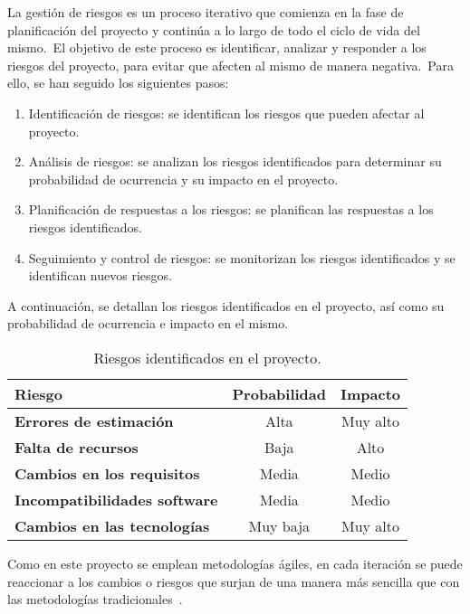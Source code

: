 
La gestión de riesgos es un proceso iterativo que comienza en la fase de planificación del proyecto y continúa a lo
largo de todo el ciclo de vida del mismo.\ El objetivo de este proceso es identificar, analizar y responder a los
riesgos del proyecto, para evitar que afecten al mismo de manera negativa.\ Para ello, se han seguido los siguientes
pasos:

\begin{enumerate}
	\item Identificación de riesgos: se identifican los riesgos que pueden afectar al proyecto.
	\item Análisis de riesgos: se analizan los riesgos identificados para determinar su probabilidad de ocurrencia y su
	impacto en el proyecto.
	\item Planificación de respuestas a los riesgos: se planifican las respuestas a los riesgos identificados.
	\item Seguimiento y control de riesgos: se monitorizan los riesgos identificados y se identifican nuevos riesgos.
\end{enumerate}
\label{itm:riesgos_pasos}

A continuación, se detallan los riesgos identificados en el proyecto, así como su probabilidad de ocurrencia e impacto
en el mismo.

\begin{table}[H]
	\centering
	\caption{Riesgos identificados en el proyecto.}
	\begin{tabular}{lcc}
		\toprule
		\textbf{Riesgo}                    & \textbf{Probabilidad} & \textbf{Impacto} \\
		\midrule
		\textbf{Errores de estimación}       & Alta                  & Muy alto         \\
		\textbf{Falta de recursos}           & Baja                  & Alto             \\
		\textbf{Cambios en los requisitos}   & Media                 & Medio            \\
		\textbf{Incompatibilidades software} & Media                 & Medio            \\
		\textbf{Cambios en las tecnologías}  & Muy baja              & Muy alto         \\
		\bottomrule
	\end{tabular}
	\label{tab:riesgos_identificados}
\end{table}

Como en este proyecto se emplean metodologías ágiles, en cada iteración se puede reaccionar a los cambios o riesgos
que surjan de una manera más sencilla que con las metodologías tradicionales~\cite{Lagestion42:online}.
